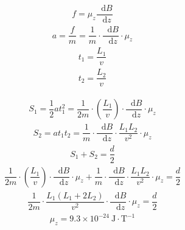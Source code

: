 \documentclass{article}
\newcommand*{\md}{\mathop{}\!\mathrm{d}}
\begin{document}
\begin{equation*}
  \begin{aligned}
    f = \mu_z \dfrac{\md B}{\md z} 
  \end{aligned}
\end{equation*}
\begin{equation*}
  \begin{aligned}
    a = \dfrac{f}{m} = \dfrac{1}{m} \cdot \dfrac{\md B}{\md z} \cdot \mu_z
  \end{aligned}
\end{equation*}
\begin{equation*}
  \begin{aligned}
    t_1 = \dfrac{L_1}{v} \\
    t_2 = \dfrac{L_2}{v} 
  \end{aligned}
\end{equation*}

\begin{equation*}
  \begin{aligned}
    S_1 = \dfrac{1}{2} a t_1^2 = \dfrac{1}{2 m} \cdot \left( \dfrac{L_1}{v} \right) \cdot \dfrac{\md B}{\md z} \cdot \mu_z 
  \end{aligned}
\end{equation*}
\begin{equation*}
  \begin{aligned}
    S_2 = a t_1 t_2 = \dfrac{1}{m} \cdot \dfrac{\md B}{\md z} \cdot \dfrac{L_1 L_2}{v^2} \cdot \mu_z 
  \end{aligned}
\end{equation*}
\begin{equation*}
  \begin{aligned}
    S_1 + S_2 = \dfrac{d}{2}
  \end{aligned}
\end{equation*}
\begin{equation*}
  \begin{aligned}
    \dfrac{1}{2 m} \cdot \left( \dfrac{L_1}{v} \right) \cdot \dfrac{\md B}{\md z} \cdot \mu_z + \dfrac{1}{m} \cdot \dfrac{\md B}{\md z} \cdot \dfrac{L_1 L_2}{v^2} \cdot \mu_z = \dfrac{d}{2} 
  \end{aligned}
\end{equation*}
\begin{equation*}
  \begin{aligned}
    \dfrac{1}{2m} \cdot \dfrac{L_1 \left( L_1 + 2 L_2 \right)}{v^2} \cdot \dfrac{\md B}{\md z} \cdot \mu_z = \dfrac{d}{2}   
  \end{aligned}
\end{equation*}
\begin{equation*}
  \begin{aligned}
    \mu_z = 9.3 \times 10^{-24} \  \mathrm{J \cdot T^{-1}}
  \end{aligned}
\end{equation*}
\end{document}

